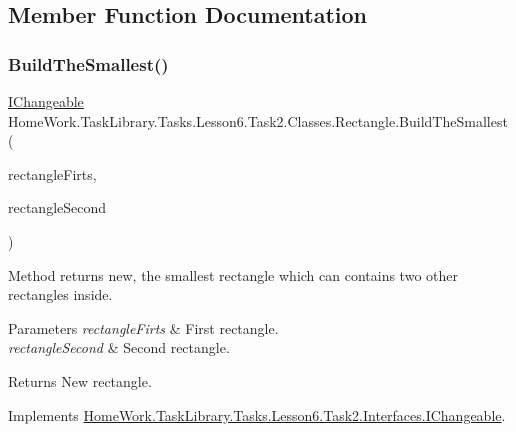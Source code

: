 \subsection{Member Function Documentation}
\mbox{\label{class_home_work_1_1_task_library_1_1_tasks_1_1_lesson6_1_1_task2_1_1_classes_1_1_rectangle_a320867e44519eebbff5887919557b996}} 
\subsubsection{\texorpdfstring{BuildTheSmallest()}{BuildTheSmallest()}}
{\footnotesize\ttfamily \mbox{\hyperlink{interface_home_work_1_1_task_library_1_1_tasks_1_1_lesson6_1_1_task2_1_1_interfaces_1_1_i_changeable}{I\+Changeable}} Home\+Work.\+Task\+Library.\+Tasks.\+Lesson6.\+Task2.\+Classes.\+Rectangle.\+Build\+The\+Smallest (\begin{DoxyParamCaption}\item[{\mbox{\hyperlink{interface_home_work_1_1_task_library_1_1_tasks_1_1_lesson6_1_1_task2_1_1_interfaces_1_1_i_changeable}{I\+Changeable}}}]{rectangle\+Firts,  }\item[{\mbox{\hyperlink{interface_home_work_1_1_task_library_1_1_tasks_1_1_lesson6_1_1_task2_1_1_interfaces_1_1_i_changeable}{I\+Changeable}}}]{rectangle\+Second }\end{DoxyParamCaption})}



Method returns new, the smallest rectangle which can contains two other rectangles inside. 


\begin{DoxyParams}{Parameters}
{\em rectangle\+Firts} & First rectangle.\\
\hline
{\em rectangle\+Second} & Second rectangle.\\
\hline
\end{DoxyParams}
\begin{DoxyReturn}{Returns}
New rectangle.
\end{DoxyReturn}


Implements \mbox{\hyperlink{interface_home_work_1_1_task_library_1_1_tasks_1_1_lesson6_1_1_task2_1_1_interfaces_1_1_i_changeable_a3ec62d87fd0e526760dcf7f929ac74ae}{Home\+Work.\+Task\+Library.\+Tasks.\+Lesson6.\+Task2.\+Interfaces.\+I\+Changeable}}.


